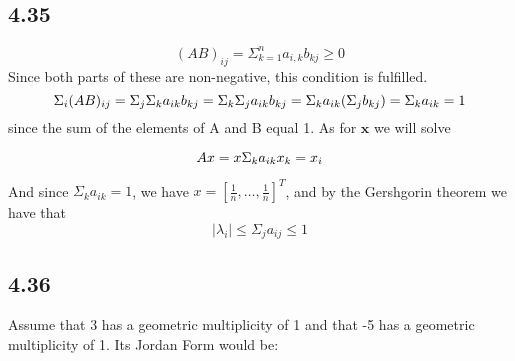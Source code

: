 \documentclass[letterpaper,12pt]{article}
\theoremstyle{definition}
\begin{document}
\subsection*{4.35}
\[(AB)_{ij} = \Sigma_{k=1}^n a_{i,k}b_{kj} \geq 0\]
Since both parts of these are non-negative, this condition is fulfilled.
\[\Sigma_i(AB)_{ij} = \Sigma_j\Sigma_k a_{ik} b_{kj}\\
 = \Sigma_k\Sigma_j a_{ik} b_{kj}\\
 = \Sigma_k a_{ik} (\Sigma_j b_{kj})\\
 =  \Sigma_k a_{ik} = 1 
 \]
since the sum of the elements of A and B equal 1.
As for $\mathbf{x}$ we will solve

\[ 
Ax = x\\
\Sigma_k a_{ik}x_k = x_i\]
    
And since $\Sigma_k a_{ik} = 1$, we have $x = [ \frac{1}{n}, \dots, \frac{1}{n} ]^T$, and by the Gershgorin theorem we have that  
\[ |\lambda_i| \leq \Sigma_j a_{ij} \leq 1\]


\subsection*{4.36}

Assume that 3 has a geometric multiplicity of 1 and that -5 has a geometric multiplicity of 1. Its Jordan Form would be:
\end{document}
